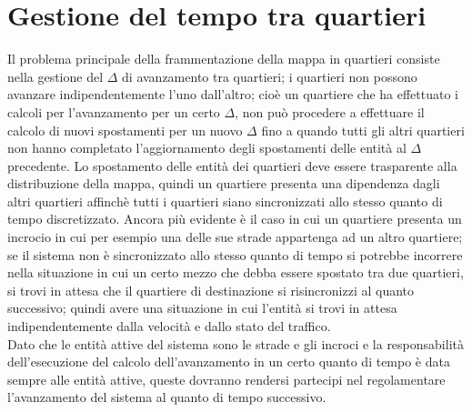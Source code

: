 \section{Gestione del tempo tra quartieri}
Il problema principale della frammentazione della mappa in quartieri consiste nella gestione del $\Delta$ di avanzamento tra quartieri; i quartieri non possono avanzare indipendentemente l'uno dall'altro; cioè un quartiere che ha effettuato i calcoli per l'avanzamento per un certo $\Delta$, non può procedere a effettuare il calcolo di nuovi spostamenti per un nuovo $\Delta$ fino a quando tutti gli altri quartieri non hanno completato l'aggiornamento degli spostamenti delle entità al $\Delta$ precedente. Lo spostamento delle entità dei quartieri deve essere trasparente alla distribuzione della mappa, quindi un quartiere presenta una dipendenza dagli altri quartieri affinchè tutti i quartieri siano sincronizzati allo stesso quanto di tempo discretizzato. Ancora più evidente è il caso in cui un quartiere presenta un incrocio in cui per esempio una delle sue strade appartenga ad un altro quartiere; se il sistema non è sincronizzato allo stesso quanto di tempo si potrebbe incorrere nella situazione in cui un certo mezzo che debba essere spostato tra due quartieri, si trovi in attesa che il quartiere di destinazione si risincronizzi al quanto successivo; quindi avere una situazione in cui l'entità si trovi in attesa indipendentemente dalla velocità e dallo stato del traffico.\\
Dato che le entità attive del sistema sono le strade e gli incroci e la responsabilità dell'esecuzione del calcolo dell'avanzamento in un certo quanto di tempo è data sempre alle entità attive, queste dovranno rendersi partecipi nel regolamentare l'avanzamento del sistema al quanto di tempo successivo.\\

